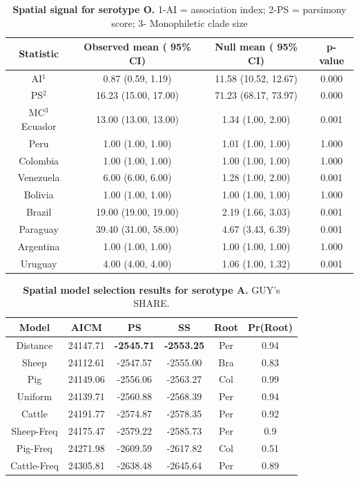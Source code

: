 \documentclass[10pt]{article}
\begin{document}
\begin{table}[!ht]
\caption{
\textbf{Spatial signal for serotype O. } 1-AI = association index; 2-PS = parsimony score; 3- Monophiletic clade size}
\begin{tabular}{cccc}
\toprule
Statistic &	Observed mean ( 95\% CI)&	Null mean ( 95\% CI)&	p-value\\
\midrule
AI$^1$ &	0.87 (0.59, 1.19)&	11.58 (10.52, 12.67)&	0.000\\
PS$^2$ &	16.23 (15.00, 17.00)&	71.23 (68.17, 73.97)&	0.000\\
MC$^3$ Ecuador& 13.00 (13.00, 13.00)&	1.34 (1.00, 2.00)&	0.001\\
Peru&	1.00 (1.00, 1.00)&	1.01 (1.00, 1.00)&	1.000\\
Colombia&	1.00 (1.00, 1.00)&	1.00 (1.00, 1.00)&	1.000\\
Venezuela&	6.00 (6.00, 6.00)&	1.28 (1.00, 2.00)&	0.001\\
Bolivia &	1.00 (1.00, 1.00)&	1.00 (1.00, 1.00)&	1.000\\
Brazil&	19.00 (19.00, 19.00)&	2.19 (1.66, 3.03)&	0.001\\
Paraguay&	39.40 (31.00, 58.00)&	4.67 (3.43, 6.39)&	0.001\\
Argentina&	1.00 (1.00, 1.00)&	1.00 (1.00, 1.00)&	1.000\\
Uruguay&	4.00 (4.00, 4.00)&	1.06 (1.00, 1.32)&	0.001\\
\bottomrule
\end{tabular}
\begin{flushleft}
\end{flushleft}
\label{tab:BaTSO}
 \end{table}
\begin{table}[!ht]
\caption{
\textbf{Spatial model selection results for serotype A. } GUY's SHARE.}
\begin{tabular}{cccccc}
\toprule
Model & AICM  & PS    & SS    & Root  & Pr(Root)\\
\midrule
    \hline
    Distance & 24147.71 & \textbf{-2545.71} & \textbf{-2553.25} & Per   & 0.94 \\
    Sheep & 24112.61 & -2547.57 & -2555.00 & Bra   & 0.83 \\
    Pig & 24149.06 & -2556.06 & -2563.27 & Col   & 0.99 \\
    Uniform & 24139.71 & -2560.88 & -2568.39 & Per   & 0.94 \\
    Cattle & 24191.77 & -2574.87 & -2578.35 & Per   & 0.92 \\
    Sheep-Freq & 24175.47 & -2579.22 & -2585.73 & Per   & 0.9 \\
    Pig-Freq & 24271.98 & -2609.59 & -2617.82 & Col   & 0.51 \\
    Cattle-Freq & 24305.81 & -2638.48 & -2645.64 & Per   & 0.89 \\
\bottomrule
\end{tabular}
\begin{flushleft}
\end{flushleft}
\label{tab:prootA}
 \end{table}
\end{document}
